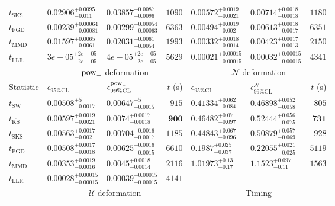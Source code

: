 \begin{tabular}{l|llr|llr}
	$t_{\mathrm{SKS}}$ & $0.02906_{-0.011}^{+0.0095}$ & $0.03857_{-0.0096}^{+0.0087}$ & $1090$ & $0.00572_{-0.0021}^{+0.0019}$ & $0.00714_{-0.0018}^{+0.0018}$ & $1180$ \\
	$t_{\mathrm{FGD}}$ & ${\mathbf{0.00239_{-0.00081}^{+0.00064}}}$ & ${\mathbf{0.00299_{-0.00063}^{+0.00054}}}$ & $6363$ & $0.00494_{-0.002}^{+0.0019}$ & $0.00613_{-0.0017}^{+0.0018}$ & $6351$ \\
	$t_{\mathrm{MMD}}$ & $0.01597_{-0.0061}^{+0.0065}$ & $0.02031_{-0.0054}^{+0.0061}$ & $1993$ & ${\mathbf{0.00332_{-0.0014}^{+0.0018}}}$ & ${\mathbf{0.00423_{-0.0013}^{+0.0017}}}$ & $2150$ \\
	$t_{\mathrm{LLR}}$ & $3e-05_{-2e-05}^{+2e-05}$ & $4e-05_{-2e-05}^{+2e-05}$ & $5629$ & $0.00021_{-0.00015}^{+0.00015}$ & $0.00032_{-0.00015}^{+0.00015}$ & $4341$ \\
	\toprule
	\multicolumn{1}{c}{} & \multicolumn{3}{c}{$\rm{pow}_{-}$-deformation} & \multicolumn{3}{c}{$\mathcal{N}$-deformation} \\
	Statistic & $\epsilon_{95\%\mathrm{CL}}$ & $\epsilon^  {\rm{pow}_{-}}_{99\%\mathrm{CL}}$ & $t$ (s) & $\epsilon_{95\%\mathrm{CL}}$ & $\epsilon^    {\mathcal{N}}_{99\%\mathrm{CL}}$ & $t$ (s) \\
	\midrule
	$t_{\mathrm{SW}}$ & $0.00508_{-0.0017}^{+5}$ & $0.00647_{-0.0015}^{+5}$ & $915$ & $0.41334_{-0.084}^{+0.062}$ & $0.46898_{-0.058}^{+0.052}$ & $805$ \\
	$t_{\overline{\mathrm{KS}}}$ & $0.00597_{-0.0021}^{+0.0019}$ & $0.0074_{-0.0018}^{+0.0017}$ & ${\mathbf{900}}$ & $0.46482_{-0.097}^{+0.07}$ & $0.52444_{-0.075}^{+0.056}$ & ${\mathbf{731}}$ \\
	$t_{\mathrm{SKS}}$ & $0.00563_{-0.002}^{+0.0017}$ & $0.00704_{-0.0017}^{+0.0016}$ & $1185$ & $0.44843_{-0.096}^{+0.067}$ & $0.50879_{-0.069}^{+0.057}$ & $928$ \\
	$t_{\mathrm{FGD}}$ & $0.00508_{-0.0018}^{+0.0017}$ & $0.00625_{-0.0015}^{+0.0016}$ & $6610$ & ${\mathbf{0.1987_{-0.037}^{+0.025}}}$ & ${\mathbf{0.22055_{-0.025}^{+0.021}}}$ & $5119$ \\
	$t_{\mathrm{MMD}}$ & ${\mathbf{0.00353_{-0.0016}^{+0.0019}}}$ & ${\mathbf{0.0045_{-0.0014}^{+0.0018}}}$ & $2116$ & $1.01973_{-0.17}^{+0.13}$ & $1.1523_{-0.11}^{+0.097}$ & $1563$ \\
	$t_{\mathrm{LLR}}$ & $0.00028_{-0.00015}^{+0.00015}$ & $0.00039_{-0.00015}^{+0.00015}$ & $4141$ & - & - & - \\
	\toprule
	\multicolumn{1}{c}{} & \multicolumn{3}{c}{$\mathcal{U}$-deformation} & \multicolumn{3}{c}{Timing} \\

\end{tabular}

